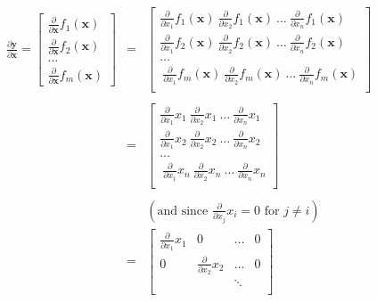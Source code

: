 \documentclass{ctexart}
\begin{document}
\begin{center}

\begin{eqnarray*}
	\frac{\partial \mathbf{y}}{\partial \mathbf{x}} = \begin{bmatrix}
	\frac{\partial}{\partial \mathbf{x}} f_1(\mathbf{x}) \\
	\frac{\partial}{\partial \mathbf{x}} f_2(\mathbf{x})\\
	\ldots\\
	\frac{\partial}{\partial \mathbf{x}} f_m(\mathbf{x})
	\end{bmatrix} &=& \begin{bmatrix}
	\frac{\partial}{\partial {x_1}} f_1(\mathbf{x})~ \frac{\partial}{\partial {x_2}} f_1(\mathbf{x}) ~\ldots~  \frac{\partial}{\partial {x_n}} f_1(\mathbf{x}) \\
	\frac{\partial}{\partial {x_1}} f_2(\mathbf{x})~ \frac{\partial}{\partial {x_2}} f_2(\mathbf{x}) ~\ldots~  \frac{\partial}{\partial {x_n}} f_2(\mathbf{x}) \\
	\ldots\\
	~\frac{\partial}{\partial {x_1}} f_m(\mathbf{x})~ \frac{\partial}{\partial {x_2}} f_m(\mathbf{x}) ~\ldots~ \frac{\partial}{\partial {x_n}} f_m(\mathbf{x}) \\
	\end{bmatrix}\\\\
	& = & \begin{bmatrix}
	\frac{\partial}{\partial {x_1}} x_1~ \frac{\partial}{\partial {x_2}} x_1 ~\ldots~ \frac{\partial}{\partial {x_n}} x_1 \\
	\frac{\partial}{\partial {x_1}} x_2~ \frac{\partial}{\partial {x_2}} x_2 ~\ldots~ \frac{\partial}{\partial {x_n}} x_2 \\
	\ldots\\
	~\frac{\partial}{\partial {x_1}} x_n~ \frac{\partial}{\partial {x_2}} x_n ~\ldots~ \frac{\partial}{\partial {x_n}} x_n \\
	\end{bmatrix}\\\\
	& & (\text{and since } \frac{\partial}{\partial {x_j}} x_i = 0 \text{ for } j \neq i)\\
	 & = & \begin{bmatrix}
	\frac{\partial}{\partial {x_1}} x_1 & 0 & \ldots& 0 \\
	0 & \frac{\partial}{\partial {x_2}} x_2 &\ldots & 0 \\
	& & \ddots\\

\end{bmatrix}
\end{eqnarray*}
\end{center}
\end{document}

